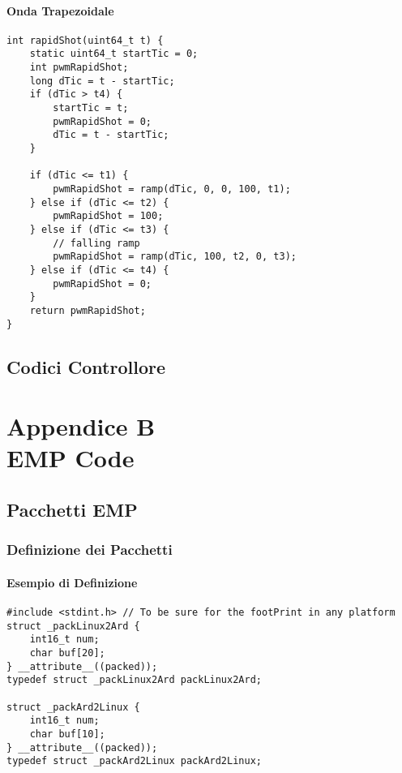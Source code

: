 \subsubsection{Onda Trapezoidale}
\begin{lstlisting}[style=cppStyle,caption={Onda Trapezoidale Periodica},label=lst:ondaTrapezoidale] 
int rapidShot(uint64_t t) {
	static uint64_t startTic = 0;
	int pwmRapidShot;
	long dTic = t - startTic;
	if (dTic > t4) {
		startTic = t;
		pwmRapidShot = 0;
		dTic = t - startTic;
	}
	
	if (dTic <= t1) {
		pwmRapidShot = ramp(dTic, 0, 0, 100, t1);
	} else if (dTic <= t2) {
		pwmRapidShot = 100;
	} else if (dTic <= t3) {
		// falling ramp
		pwmRapidShot = ramp(dTic, 100, t2, 0, t3);
	} else if (dTic <= t4) {
		pwmRapidShot = 0;
	}	
	return pwmRapidShot;
}
\end{lstlisting}

\newpage

\section{Codici Controllore}


\chapter*{Appendice B\\ EMP Code}\label{EMPCode}
\setcounter{chapter}{\thechapter + 1}

\section{Pacchetti EMP}
\subsection{Definizione dei Pacchetti}
\subsubsection{Esempio di Definizione}
\begin{lstlisting}[style=cppStyle,caption={esempio di definizione Pacchetto in EMP},label=lst:EMPpackDef] 
#include <stdint.h>	// To be sure for the footPrint in any platform
struct _packLinux2Ard {
	int16_t num;
	char buf[20];
} __attribute__((packed));
typedef struct _packLinux2Ard packLinux2Ard;

struct _packArd2Linux {
	int16_t num;
	char buf[10];
} __attribute__((packed));
typedef struct _packArd2Linux packArd2Linux;
\end{lstlisting}

